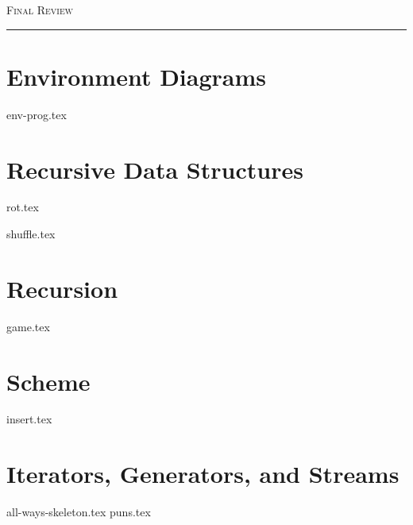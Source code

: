 \documentclass{exam}
\begin{document}
\newpage
{\huge \vspace*{0.5cm} \textsc{Final Review}}

\rule{\textwidth}{0.15em}

\section{Environment Diagrams}
\begin{questions}
{env-prog.tex}
\end{questions}
\newpage
\section{Recursive Data Structures}
\begin{questions}
{rot.tex}

\newpage
{shuffle.tex}
\end{questions}

\newpage
\section{Recursion}
\begin{questions}
{game.tex}
\end{questions}

\newpage
\section{Scheme}
\begin{questions}
{insert.tex}
\end{questions}


\newpage
\section{Iterators, Generators, and Streams}
\begin{questions}
{all-ways-skeleton.tex}
\newpage
{puns.tex}
\end{questions}




\end{document}

